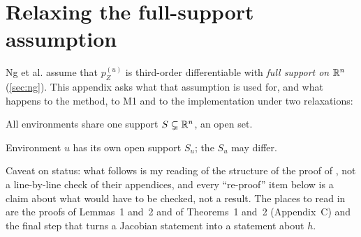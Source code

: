 \section{Relaxing the full-support assumption}
\label{app:support}

Ng et al. \cite{ng2025} assume that $p^{(u)}_Z$ is third-order differentiable with \emph{full 
support on $\mathbb{R}^n$} (\cref{sec:ng}). This appendix asks what that assumption is used for, and what 
happens to the method, to M1 and to the implementation under two relaxations:
\begin{description}[leftmargin=1.5em,style=nextline]
\item[R1 (common support).] All environments share one support $S\subsetneq\mathbb{R}^n$, an open set.
\item[R2 (per-environment support).] Environment $u$ has its own open support $S_u$; the $S_u$ may 
differ.
\end{description}
Caveat on status: what follows is my reading of the structure of the proof of \cite{ng2025}, not a
line-by-line check of their appendices, and every ``re-proof'' item below is a claim about what 
would have to be checked, not a result. The places to read in \cite{ng2025} are the proofs of 
Lemmas~1 and~2 and of Theorems~1 and~2 (Appendix~C) and the final step that turns a Jacobian statement into a statement about $h$.

